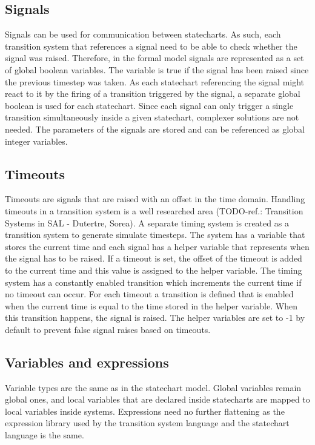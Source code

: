 {  \subsection{Signals}
Signals can be used for communication between statecharts. As such, each transition system that references a signal need to be able to check whether the signal was raised. Therefore, in the formal model signals are represented as a set of global boolean variables. The variable is true if the signal has been raised since the previous timestep was taken. As each statechart referencing the signal might react to it by the firing of a transition triggered by the signal, a separate global boolean is used for each statechart. Since each signal can only trigger a single transition simultaneously inside a given statechart, complexer solutions are not needed. The parameters of the signals are stored and can be referenced as global integer variables.
  \subsection{Timeouts}
Timeouts are signals that are raised with an offset in the time domain. Handling timeouts in a transition system is a well researched area (TODO-ref.: Transition Systems in SAL - Dutertre, Sorea). A separate timing system is created as a transition system to generate simulate timesteps. The system has a variable that stores the current time and each signal has a helper variable that represents when the signal has to be raised. If a timeout is set, the offset of the timeout is added to the current time and this value is assigned to the helper variable. The timing system has a constantly enabled transition which increments the current time if no timeout can occur. For each timeout a transition is defined that is enabled when the current time is equal to the time stored in the helper variable. When this transition happens, the signal is raised. The helper variables are set to -1 by default to prevent false signal raises based on timeouts.
  \subsection{Variables and expressions}
Variable types are the same as in the statechart model. Global variables remain global ones, and local variables that are declared inside statecharts are mapped to local variables inside systems. Expressions need no further flattening as the expression library used by the transition system language and the statechart language is the same.
}
